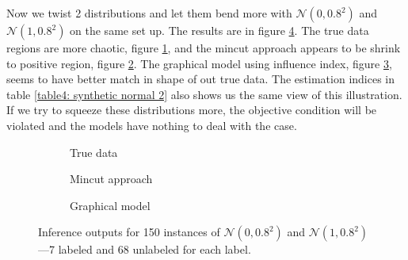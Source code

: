 \begin{table}[ht!]
	\centering
	\captionsetup{justification=centering}
	\caption{Measurement of inferences on $\mathcal{N}(0, 0.6^2)$ and $\mathcal{N}(1, 0.6^2)$.}
	\label{table4: synthetic normal 1}
\end{table}

Now we twist 2 distributions and let them bend more with $\mathcal{N}(0, 0.8^2)$ and $\mathcal{N}(1, 0.8^2)$ on the same set up. The results are in figure \ref{fig4: synthetic data: normal distribution 2}. The true data regions are more chaotic, figure \ref{fig4a: synthetic data: normal distribution 2}, and the mincut approach appears to be shrink to positive region, figure \ref{fig4b: synthetic data: normal distribution 2}. The graphical model using influence index, figure \ref{fig4c: synthetic data: normal distribution 2}, seems to have better match in shape of out true data. The estimation indices in table \ref{table4: synthetic normal 2} also shows us the same view of this illustration. If we try to squeeze these distributions more, the objective condition will be violated and the models have nothing to deal with the case.

\begin{figure}[ht!]
	\centering
	\captionsetup[subfigure]{justification=centering}
	\begin{subfigure}[b]{0.31\textwidth}
		\centering
		
		\caption{True data}
		\label{fig4a: synthetic data: normal distribution 2}
	\end{subfigure}
	\hfill
	\begin{subfigure}[b]{0.31\textwidth}
		\centering
		
		\caption{Mincut approach}
		\label{fig4b: synthetic data: normal distribution 2}
	\end{subfigure}
	\hfill
	\begin{subfigure}[b]{0.31\textwidth}
		\centering
		
		\caption{Graphical model}
		\label{fig4c: synthetic data: normal distribution 2}
	\end{subfigure}
	\caption[Inference outputs on $\mathcal{N}(0, 0.8^2)$ and $\mathcal{N}(1, 0.8^2)$.]{Inference outputs for 150 instances of $\mathcal{N}(0, 0.8^2)$ and $\mathcal{N}(1, 0.8^2)$---7 labeled and 68 unlabeled for each label.}
	\label{fig4: synthetic data: normal distribution 2}
\end{figure}


